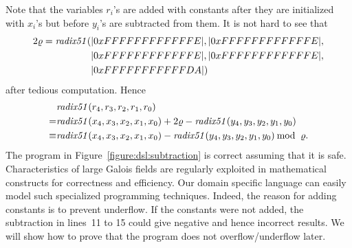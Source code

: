 Note that the variables ${r}_i$'s are added with constants after they are initialized with ${x}_i$'s but before ${y}_i$'s are subtracted from them.
It is not hard to see that
\[
\begin{aligned}
2\varrho = \mathit{radix51} (&|0xFFFFFFFFFFFFE|, |0xFFFFFFFFFFFFE|, \\
          & |0xFFFFFFFFFFFFE|, |0xFFFFFFFFFFFFE|, \\
          & |0xFFFFFFFFFFFDA|)
\end{aligned}
\]
after tedious computation.
Hence
\[
\begin{aligned}
  & \mathit{radix51}({r}_4, {r}_3, {r}_2, {r}_1, {r}_0) \\
= & \mathit{radix51}({x}_4, {x}_3, {x}_2, {x}_1, {x}_0) + 2 \varrho - \mathit{radix51}({y}_4, {y}_3, {y}_2, {y}_1, {y}_0) \\
\equiv & \mathit{radix51}({x}_4, {x}_3, {x}_2, {x}_1, {x}_0) - \mathit{radix51}({y}_4, {y}_3, {y}_2, {y}_1, {y}_0) \mathbin{\textmd{mod}}\ \varrho.
\end{aligned}
\]
The program in Figure~\ref{figure:dsl:subtraction} is correct assuming that it is safe.
Characteristics of large Galois fields are regularly exploited in mathematical constructs for correctness and efficiency.
Our domain specific language can easily model such specialized programming techniques.
Indeed, the reason for adding constants is to prevent underflow.
If the constants were not added, the subtraction in lines~11 to 15 could give negative and hence incorrect results.
We will show how to prove that the program does not overflow/underflow later.

